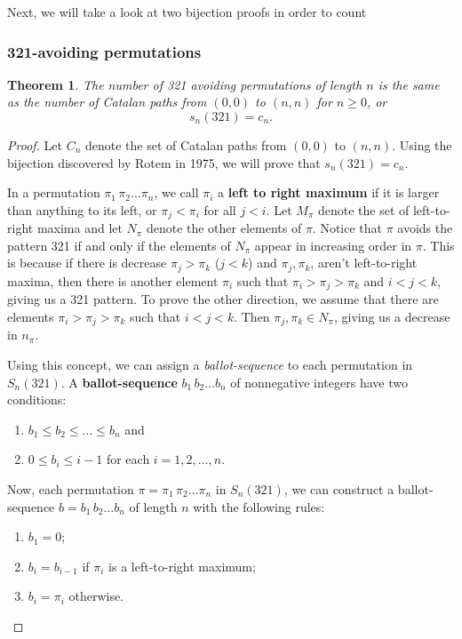 \documentclass[12pt]{article}
\newtheorem{thm}{Theorem} %
\begin{document}
Next, we will take a look at two bijection proofs in order to count

\subsubsection{321-avoiding permutations}
\begin{thm}
    The number of 321 avoiding permutations of length $n$ is the same as the number of Catalan paths from $(0,0)$ to $(n,n)$ for $n\geq0$, or $$s_n(321)=c_n.$$
\end{thm}
\begin{proof}
    Let $C_n$ denote the set of Catalan paths from $(0,0)$ to $(n,n)$. Using the bijection discovered by Rotem in 1975\cite{rotem_correspondence_1975}, we will prove that $s_n(321)=c_n$.

    In a permutation $\pi_1\,\pi_2\dots\pi_n$, we call $\pi_i$ a \textbf{left to right maximum} if it is larger than anything to its left, or $\pi_j<\pi_i$ for all $j<i$. Let $M_\pi$ denote the set of left-to-right maxima and let $N_\pi$ denote the other elements of $\pi$. Notice that $\pi$ avoids the pattern 321 if and only if the elements of $N_\pi$ appear in increasing order in $\pi$. This is because if there is decrease $\pi_j>\pi_k$ ($j<k$) and $\pi_j,\pi_k$, aren't left-to-right maxima, then there is another element $\pi_i$ such that $\pi_i>\pi_j>\pi_k$ and $i<j<k$, giving us a 321 pattern. To prove the other direction, we assume that there are elements $\pi_i>\pi_j>\pi_k$ such that $i<j<k$. Then $\pi_j,\pi_k\in N_\pi$, giving us a decrease in $n_\pi$. 
    
    Using this concept, we can assign a \textit{ballot-sequence} to each permutation in $S_n(321)$. A \textbf{ballot-sequence} $b_1\,b_2\dots b_n$ of nonnegative integers have two conditions:\begin{enumerate}
        \item $b_1\leq b_2\leq\dots\leq b_n$ and
        \item $0\leq b_i\leq i-1$ for each $i=1,2,\dots, n$.
    \end{enumerate}
    Now, each permutation $\pi=\pi_1\,\pi_2\dots\pi_n$ in $S_n(321)$, we can construct a ballot-sequence $b=b_1\,b_2\dots b_n$ of length $n$ with the following rules: \begin{enumerate}
        \item $b_1=0$;
        \item $b_{i}=b_{i-1}$ if $\pi_i$ is a left-to-right maximum;
        \item $b_i=\pi_i$ otherwise.
    \end{enumerate}


\end{proof}
\end{document}
